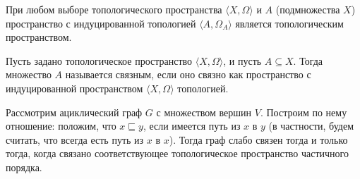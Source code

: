 \begin{theorem} При любом выборе топологического пространства $\langle X, \Omega \rangle$ и 
$A$ (подмножества $X$) пространство с индуцированной топологией 
$\langle A, \Omega_A \rangle$ является топологическим пространством.
\end{theorem}


\begin{definition} Пусть задано топологическое пространство $\langle X, \Omega \rangle$, и пусть
$A \subseteq X$. Тогда множество $A$ называется связным, если оно связно как пространство
с индуцированной пространством $\langle X, \Omega \rangle$ топологией.
\end{definition}

\begin{theorem} Рассмотрим ациклический граф $G$ с множеством вершин $V$. 
Построим по нему
отношение: положим, что $x \sqsubseteq y$, если имеется путь из $x$ в $y$
(в частности, будем считать, что всегда есть путь из $x$ в $x$).
Тогда граф слабо связен тогда и только тогда, когда связано соответствующее 
топологическое пространство частичного порядка. 
\end{theorem}
